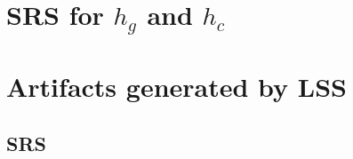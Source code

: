 \documentclass{sig-alternate-05-2015}
\newcommand{\lss}{LSS}
\begin{document}
%
%

\appendix
\section{SRS for $h_g$ and $h_c$} \label{app:srs}


\section{Artifacts generated by \lss} \label{app:gen}
\subsection{SRS}
\end{document}
